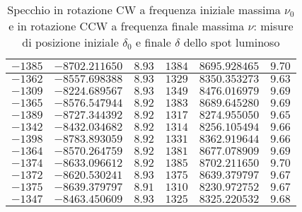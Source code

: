 \documentclass[]{article}
\begin{document}
\begin{table}
\begin{tabular}{||c|c|c||c|c|c||}
        $-1385$ & $-8702.211650 $ & $8.93$ & $1384$ & $8695.928465$ & $9.70$\\\hline
        $-1362$ & $-8557.698388 $ & $8.93$ & $1329$ & $8350.353273$ & $9.63$\\\hline
        $-1309$ & $-8224.689567 $ & $8.93$ & $1349$ & $8476.016979$ & $9.69$\\\hline
        $-1365$ & $-8576.547944 $ & $8.92$ & $1383$ & $8689.645280$ & $9.69$\\\hline
        $-1389$ & $-8727.344392 $ & $8.92$ & $1317$ & $8274.955050$ & $9.65$\\\hline
        $-1342$ & $-8432.034682 $ & $8.92$ & $1314$ & $8256.105494$ & $9.66$\\\hline
        $-1398$ & $-8783.893059 $ & $8.92$ & $1331$ & $8362.919644$ & $9.66$\\\hline
        $-1364$ & $-8570.264759 $ & $8.92$ & $1381$ & $8677.078909$ & $9.69$\\\hline
        $-1374$ & $-8633.096612 $ & $8.92$ & $1385$ & $8702.211650$ & $9.70$\\\hline
        $-1372$ & $-8620.530241 $ & $8.93$ & $1375$ & $8639.379797$ & $9.67$\\\hline
        $-1375$ & $-8639.379797 $ & $8.91$ & $1310$ & $8230.972752$ & $9.67$\\\hline
        $-1347$ & $-8463.450609 $ & $8.93$ & $1325$ & $8325.220532$ & $9.68$\\\hline
    \end{tabular}
    \caption{Specchio in rotazione CW a frequenza iniziale massima $\nu_0$ e in rotazione CCW a frequenza finale massima $\nu$: misure di posizione iniziale $\delta_0$ e finale $\delta$ dello spot luminoso}
    \label{CW_CCW}
\end{table}
\end{document}
